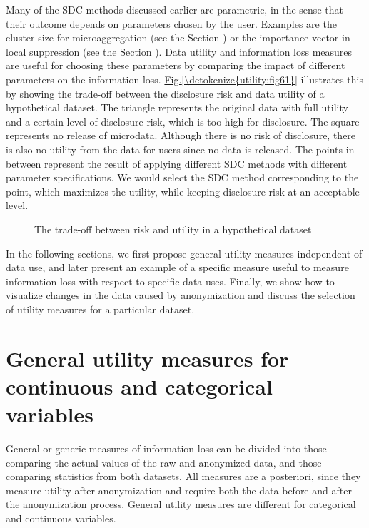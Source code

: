 \documentclass[letterpaper,10pt,english]{sphinxmanual}
\begin{document}
Many of the SDC methods discussed earlier are parametric, in the sense
that their outcome depends on parameters chosen by the user. Examples
are the cluster size for microaggregation (see the Section
) or the
importance vector in local suppression (see the Section
). Data utility
and information loss measures are useful for choosing these parameters
by comparing the impact of different parameters on the information loss.
\hyperref[\detokenize{utility:fig61}]{Fig.\@ \ref{\detokenize{utility:fig61}}} illustrates this by showing the trade-off between the
disclosure risk and data utility of a hypothetical dataset. The triangle
represents the original data with full utility and a certain level of
disclosure risk, which is too high for disclosure. The square represents
no release of microdata. Although there is no risk of disclosure, there
is also no utility from the data for users since no data is released.
The points in between represent the result of applying different SDC
methods with different parameter specifications. We would select the SDC
method corresponding to the point, which maximizes the utility, while
keeping disclosure risk at an acceptable level.

\begin{figure}[htbp]
\centering
\capstart

\noindent{}
\caption{The trade-off between risk and utility in a hypothetical dataset}\label{\detokenize{utility:fig61}}\label{\detokenize{utility:id3}}\end{figure}

In the following sections, we first propose general utility measures
independent of data use, and later present an example of a specific
measure useful to measure information loss with respect to specific data
uses. Finally, we show how to visualize changes in the data caused by
anonymization and discuss the selection of utility measures for a
particular dataset.


\section{General utility measures for continuous and categorical variables}
\label{\detokenize{utility:general-utility-measures-for-continuous-and-categorical-variables}}
General or generic measures of information loss can be divided into
those comparing the actual values of the raw and anonymized data, and
those comparing statistics from both datasets. All measures are a
posteriori, since they measure utility after anonymization and require
both the data before and after the anonymization process. General
utility measures are different for categorical and continuous variables.
\end{document}
